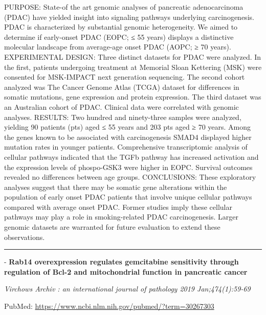 \documentclass[]{article}
\begin{document}
PURPOSE: State-of the art genomic analyses of pancreatic adenocarcinoma
(PDAC) have yielded insight into signaling pathways underlying
carcinogenesis. PDAC is characterized by substantial genomic
heterogeneity. We aimed to determine if early-onset PDAC (EOPC; ≤ 55
years) displays a distinctive molecular landscape from average-age onset
PDAC (AOPC; ≥ 70 years). EXPERIMENTAL DESIGN: Three distinct datasets
for PDAC were analyzed. In the first, patients undergoing treatment at
Memorial Sloan Kettering (MSK) were consented for MSK-IMPACT next
generation sequencing. The second cohort analyzed was The Cancer Genome
Atlas (TCGA) dataset for differences in somatic mutations, gene
expression and protein expression. The third dataset was an Australian
cohort of PDAC. Clinical data were correlated with genomic analyses.
RESULTS: Two hundred and ninety-three samples were analyzed, yielding 90
patients (pts) aged ≤ 55 years and 203 pts aged ≥ 70 years. Among the
genes known to be associated with carcinogenesis SMAD4 displayed higher
mutation rates in younger patients. Comprehensive transcriptomic
analysis of cellular pathways indicated that the TGFb pathway has
increased activation and the expression levels of phospo-GSK3 were
higher in EOPC. Survival outcomes revealed no differences between age
groups. CONCLUSIONS: These exploratory analyses suggest that there may
be somatic gene alterations within the population of early onset PDAC
patients that involve unique cellular pathways compared with average
onset PDAC. Former studies imply these cellular pathways may play a role
in smoking-related PDAC carcinogenesis. Larger genomic datasets are
warranted for future evaluation to extend these observations.

{}

{}

\begin{center}\rule{0.5\linewidth}{\linethickness}\end{center}

 - \textbf{Rab14 overexpression regulates gemcitabine sensitivity
through regulation of Bcl-2 and mitochondrial function in pancreatic
cancer}

\emph{Virchows Archiv : an international journal of pathology 2019
Jan;474(1):59-69}

PubMed: \url{https://www.ncbi.nlm.nih.gov/pubmed/?term=30267303}
\end{document}
